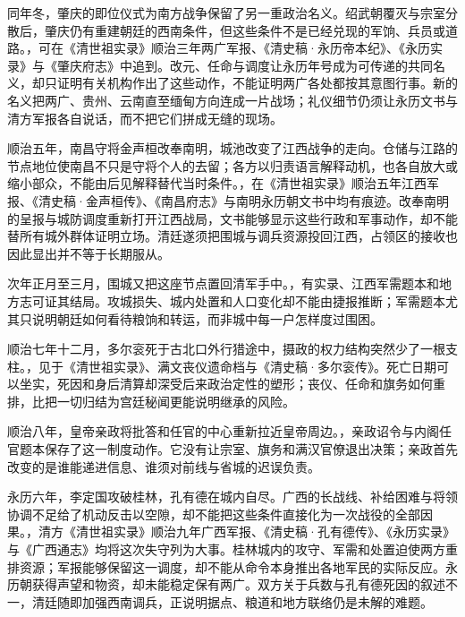 同年冬，肇庆的即位仪式为南方战争保留了另一重政治名义。绍武朝覆灭与宗室分散后，肇庆仍有重建朝廷的西南条件，但这些条件不是已经兑现的军饷、兵员或道路。，可在《清世祖实录》顺治三年两广军报、《清史稿·永历帝本纪》、《永历实录》与《肇庆府志》中追到。改元、任命与调度让永历年号成为可传递的共同名义，却只证明有关机构作出了这些动作，不能证明两广各处都按其意图行事。新的名义把两广、贵州、云南直至缅甸方向连成一片战场；礼仪细节仍须让永历文书与清方军报各自说话，而不把它们拼成无缝的现场。

顺治五年，南昌守将金声桓改奉南明，城池改变了江西战争的走向。仓储与江路的节点地位使南昌不只是守将个人的去留；各方以归责语言解释动机，也各自放大或缩小部众，不能由后见解释替代当时条件。，在《清世祖实录》顺治五年江西军报、《清史稿·金声桓传》、《南昌府志》与南明永历朝文书中均有痕迹。改奉南明的呈报与城防调度重新打开江西战局，文书能够显示这些行政和军事动作，却不能替所有城外群体证明立场。清廷遂须把围城与调兵资源投回江西，占领区的接收也因此显出并不等于长期服从。

次年正月至三月，围城又把这座节点置回清军手中。，有实录、江西军需题本和地方志可证其结局。攻城损失、城内处置和人口变化却不能由捷报推断；军需题本尤其只说明朝廷如何看待粮饷和转运，而非城中每一户怎样度过围困。

顺治七年十二月，多尔衮死于古北口外行猎途中，摄政的权力结构突然少了一根支柱。，见于《清世祖实录》、满文丧仪遗命档与《清史稿·多尔衮传》。死亡日期可以坐实，死因和身后清算却深受后来政治定性的塑形；丧仪、任命和旗务如何重排，比把一切归结为宫廷秘闻更能说明继承的风险。

顺治八年，皇帝亲政将批答和任官的中心重新拉近皇帝周边。，亲政诏令与内阁任官题本保存了这一制度动作。它没有让宗室、旗务和满汉官僚退出决策；亲政首先改变的是谁能递进信息、谁须对前线与省城的迟误负责。

永历六年，李定国攻破桂林，孔有德在城内自尽。广西的长战线、补给困难与将领协调不足给了机动反击以空隙，却不能把这些条件直接化为一次战役的全部因果。，清方《清世祖实录》顺治九年广西军报、《清史稿·孔有德传》、《永历实录》与《广西通志》均将这次失守列为大事。桂林城内的攻守、军需和处置迫使两方重排资源；军报能够保留这一调度，却不能从命令本身推出各地军民的实际反应。永历朝获得声望和物资，却未能稳定保有两广。双方关于兵数与孔有德死因的叙述不一，清廷随即加强西南调兵，正说明据点、粮道和地方联络仍是未解的难题。

